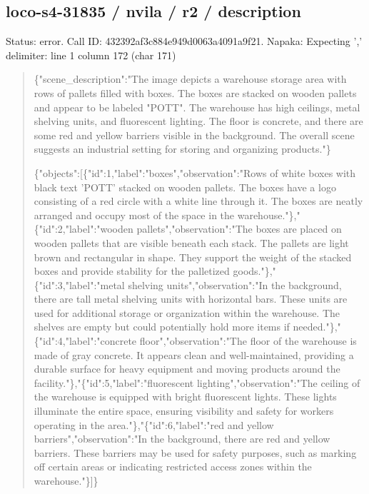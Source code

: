 \documentclass[10pt,a4paper]{article}
\begin{document}
\subsection*{loco-s4-31835 / nvila / r2 / description}
Status: error. Call ID: 432392af3c884e949d0063a4091a9f21. Napaka: Expecting ',' delimiter: line 1 column 172 (char 171)
\begin{quote}\footnotesize
\{"scene\_description":\allowbreak{}"The image depicts a warehouse storage area with rows of pallets filled with boxes. The boxes are stacked on wooden pallets and appear to be labeled "POTT". The warehouse has high ceilings,\allowbreak{} metal shelving units,\allowbreak{} and fluorescent lighting. The floor is concrete,\allowbreak{} and there are some red and yellow barriers visible in the background. The overall scene suggests an industrial setting for storing and organizing products."\}\par
\par
\{"objects":\allowbreak{}[\{"id":\allowbreak{}1,\allowbreak{}"label":\allowbreak{}"box\allowbreak{}es",\allowbreak{}"observation":\allowbreak{}"Rows of white boxes with black text 'POTT' stacked on wooden pallets. The boxes have a logo consisting of a red circle with a white line through it. The boxes are neatly arranged and occupy most of the space in the warehouse."\},\allowbreak{}"\{"id":\allowbreak{}2,\allowbreak{}"label":\allowbreak{}"w\allowbreak{}ooden pallets",\allowbreak{}"observation":\allowbreak{}"The boxes are placed on wooden pallets that are visible beneath each stack. The pallets are light brown and rectangular in shape. They support the weight of the stacked boxes and provide stability for the palletized goods."\},\allowbreak{}"\{"id":\allowbreak{}3,\allowbreak{}"label":\allowbreak{}"metal\allowbreak{} shelving units",\allowbreak{}"observation":\allowbreak{}"In the background,\allowbreak{} there are tall metal shelving units with horizontal bars. These units are used for additional storage or organization within the warehouse. The shelves are empty but could potentially hold more items if needed."\},\allowbreak{}"\{"id":\allowbreak{}4,\allowbreak{}"label":\allowbreak{}"conc\allowbreak{}rete floor",\allowbreak{}"observation":\allowbreak{}"The floor of the warehouse is made of gray concrete. It appears clean and well-maintained,\allowbreak{} providing a durable surface for heavy equipment and moving products around the facility."\},\allowbreak{}"\{"id":\allowbreak{}5,\allowbreak{}"label":\allowbreak{}"fl\allowbreak{}uorescent lighting",\allowbreak{}"observation":\allowbreak{}"The ceiling of the warehouse is equipped with bright fluorescent lights. These lights illuminate the entire space,\allowbreak{} ensuring visibility and safety for workers operating in the area."\},\allowbreak{}"\{"id":\allowbreak{}6,\allowbreak{}"label":\allowbreak{}"red and yellow barriers",\allowbreak{}"observation":\allowbreak{}"In the background,\allowbreak{} there are red and yellow barriers. These barriers may be used for safety purposes,\allowbreak{} such as marking off certain areas or indicating restricted access zones within the warehouse."\}]\}
\end{quote}
\end{document}
